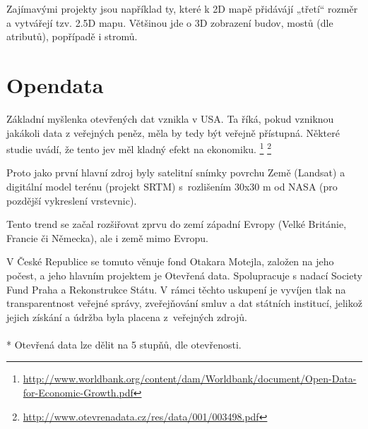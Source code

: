 Zajímavými projekty jsou například ty, které k 2D mapě přidávájí „třetí“ rozměr a
vytvářejí tzv. 2.5D mapu. Většinou jde o 3D zobrazení budov, mostů (dle
atributů), popřípadě i stromů.



\section{Opendata}
\label{opendata}

Základní myšlenka otevřených dat vznikla v USA.
Ta říká, pokud vzniknou jakákoli data z veřejných peněz, měla by tedy být
veřejně přístupná. Některé studie uvádí, že tento jev měl kladný efekt na ekonomiku.
\footnote{\url{http://www.worldbank.org/content/dam/Worldbank/document/Open-Data-for-Economic-Growth.pdf}}
\footnote{\url{http://www.otevrenadata.cz/res/data/001/003498.pdf}}

Proto jako první hlavní zdroj byly satelitní snímky povrchu Země (Landsat) %
a digitální model terénu (projekt SRTM) %
s~rozlišením 30x30 m od NASA (pro pozdější vykreslení vrstevnic).

Tento trend se začal rozšiřovat zprvu do zemí západní Evropy
(Velké Británie, Francie či Německa), ale i země mimo Evropu.\cite{OpendataTrends}

V České Republice se tomuto věnuje fond Otakara Motejla, založen na jeho počest,
a jeho hlavním projektem je Otevřená data. Spolupracuje s nadací Society Fund
Praha a Rekonstrukce Státu.
V rámci těchto uskupení je vyvíjen tlak na transparentnost veřejné správy,
zveřejňování smluv a dat státních institucí, jelikož jejich získání a údržba byla
placena z~veřejných zdrojů.
\\
\\*
Otevřená data lze dělit na 5 stupňů,
dle otevřenosti.

